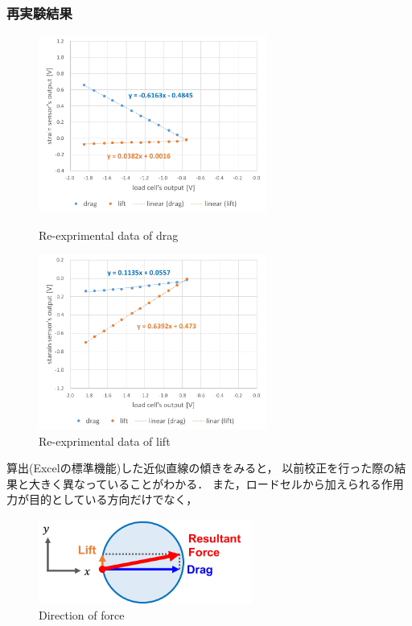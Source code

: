 \documentclass[twocolumn,a4j]{jsarticle}
\begin{document}
\subsubsection*{再実験結果}
\begin{figure}[htbp]
    \footnotesize
    \begin{center}
        \includegraphics[width=75mm]{../images/graph_21119_drag_1.png}
        \caption{Re-exprimental data of drag}
        \includegraphics[width=75mm]{../images/graph_21119_lift_1.png}
        \caption{Re-exprimental data of lift}
    \end{center}
\end{figure}

算出(Excelの標準機能)した近似直線の傾きをみると，
以前校正を行った際の結果と大きく異なっていることがわかる．
また，ロードセルから加えられる作用力が目的としている方向だけでなく，


\begin{figure}[htbp]
    \footnotesize
    \begin{center}
        \includegraphics[width=70mm]{../images/image_11.png}
        \caption{Direction of force}
    \end{center}
\end{figure}
\end{document}
